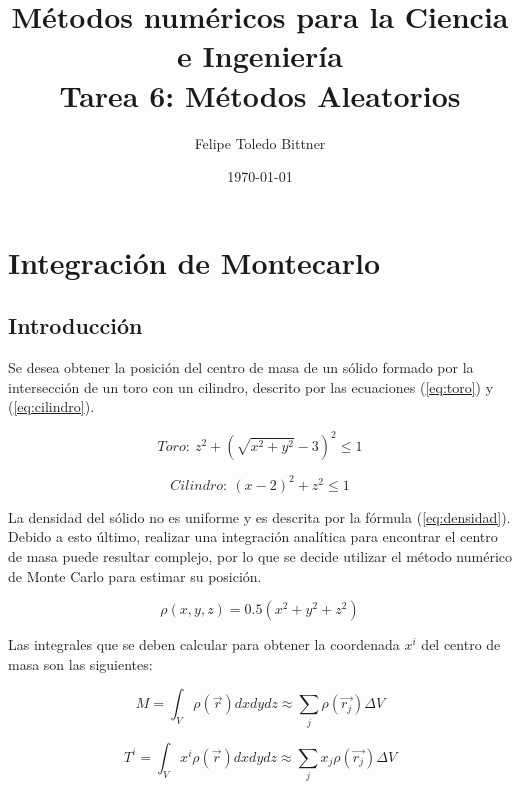 \documentclass{article}
\title{M\'etodos num\'ericos para la Ciencia e Ingenier\'ia \\ Tarea 6: Métodos Aleatorios} %
\author{Felipe Toledo Bittner} %
\date{\today} %
\begin{document}
\maketitle %


\section{Integración de Montecarlo}

\subsection{Introducción}
\label{sec:introduccion_P1}

Se desea obtener la posición del centro de masa de un sólido formado por la intersección de un toro con un cilindro, descrito por las ecuaciones (\ref{eq:toro}) y (\ref{eq:cilindro}).

\begin{equation}
  Toro:\ z^2 + \left( \sqrt{x^2 + y^2} - 3 \right)^2 \leq 1
  \label{eq:toro}
\end{equation}

\begin{equation}
  Cilindro:\ (x - 2)^2 + z^2 \leq 1
  \label{eq:cilindro}
\end{equation}

La densidad del sólido no es uniforme y es descrita por la fórmula (\ref{eq:densidad}). Debido a esto último, realizar una integración analítica para encontrar el centro de masa puede resultar complejo, por lo que se decide utilizar el método numérico de Monte Carlo para estimar su posición.

\begin{equation}
  \rho(x, y, z) = 0.5 (x^2 + y^2 + z^2)
  \label{eq:densidad}
\end{equation}

Las integrales que se deben calcular para obtener la coordenada $x^i$ del centro de masa son las siguientes:

\begin{equation}
  M = \int_V \rho(\vec{r}) dx dy dz \approx \sum_j \rho(\vec{r_j}) \Delta V
  \label{eq:calculo_masa}
\end{equation}

\begin{equation}
  T^i = \int_V x^i \rho(\vec{r}) dx dy dz \approx \sum_j x_j \rho(\vec{r_j}) \Delta V
  \label{eq:calculo_torque}
\end{equation}
\end{document}
